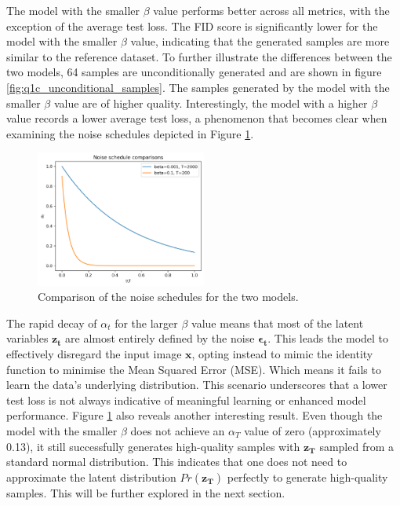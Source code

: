 \documentclass[11pt]{article}
\begin{document}
The model with the smaller $\beta$ value performs better across all metrics, with the exception of the average test loss. The FID score is significantly lower for the model with the smaller $\beta$ value, indicating that the generated samples are more similar to the reference dataset.  To further illustrate the differences between the two models, 64 samples are unconditionally generated and are shown in figure \ref{fig:q1c_unconditional_samples}. The samples generated by the model with the smaller $\beta$ value are of higher quality. Interestingly, the model with a higher $\beta$ value records a lower average test loss, a phenomenon that becomes clear when examining the noise schedules depicted in Figure \ref{fig:q1c_noise_schedules}.
\begin{figure}[H]
    \centering
    \includegraphics[width=0.5\textwidth]{figs/q1c_noise_schedule_comparison.png}
    \caption{Comparison of the noise schedules for the two models.}
    \label{fig:q1c_noise_schedules}
\end{figure}
The rapid decay of $\alpha_t$ for the larger $\beta$ value means that most of the latent variables $\mathbf{z_t}$ are almost entirely defined by the noise $\boldsymbol{\epsilon_t}$. This leads the model to effectively disregard the input image $\mathbf{x}$, opting instead to mimic the identity function to minimise the Mean Squared Error (MSE). Which means it fails to learn the data's underlying distribution. This scenario underscores that a lower test loss is not always indicative of meaningful learning or enhanced model performance. Figure \ref{fig:q1c_noise_schedules} also reveals another interesting result. Even though the model with the smaller $\beta$ does not achieve an $\alpha_T$ value of zero (approximately 0.13), it still successfully generates high-quality samples with $\mathbf{z_T}$ sampled from a standard normal distribution. This indicates that one does not need to approximate the latent distribution $Pr(\mathbf{z_T})$ perfectly to generate high-quality samples. This will be further explored in the next section.
\end{document}
